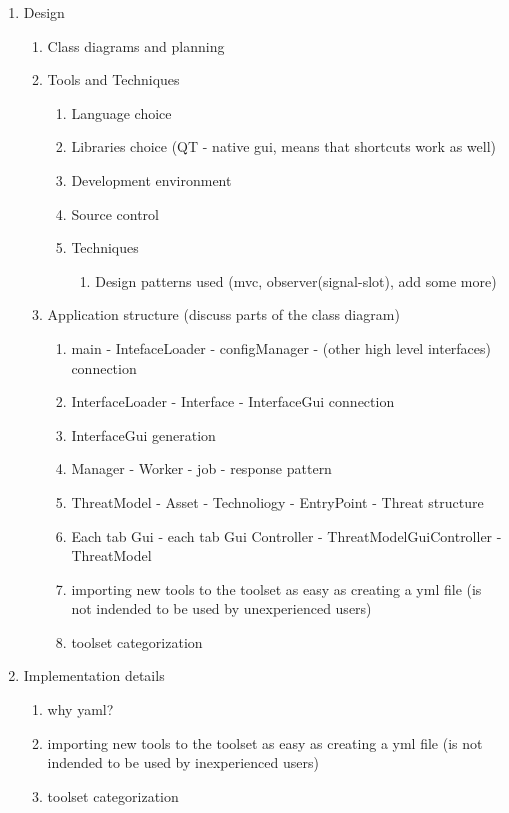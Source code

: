 \begin{enumerate}
	\item Design
	\begin{enumerate}
		\item Class diagrams and planning
			\item Tools and Techniques
			\begin{enumerate}
				\item Language choice
				\item Libraries choice (QT - native gui, means that shortcuts work as well)
				\item Development environment
				\item Source control
				\item Techniques
				\begin{enumerate}
					\item Design patterns used (mvc, observer(signal-slot), add some more)
				\end{enumerate}
			\end{enumerate}
		\item Application structure (discuss parts of the class diagram)
		\begin{enumerate}
			\item main - IntefaceLoader - configManager - (other high level interfaces) connection
			\item InterfaceLoader - Interface - InterfaceGui connection
			\item InterfaceGui generation
			\item Manager - Worker - job - response pattern
			\item ThreatModel - Asset - Technoliogy - EntryPoint - Threat structure
			\item Each tab Gui - each tab Gui Controller - ThreatModelGuiController - ThreatModel
			
			\item importing new tools to the toolset as easy as creating a yml file (is not indended to be used by unexperienced users)
			\item toolset categorization
		\end{enumerate}
			
	\end{enumerate}

	\item Implementation details
	\begin{enumerate}
		\item why yaml?
		\item importing new tools to the toolset as easy as creating a yml file (is not indended to be used by inexperienced users)
		\item toolset categorization
		

\end{enumerate}
\end{enumerate}
